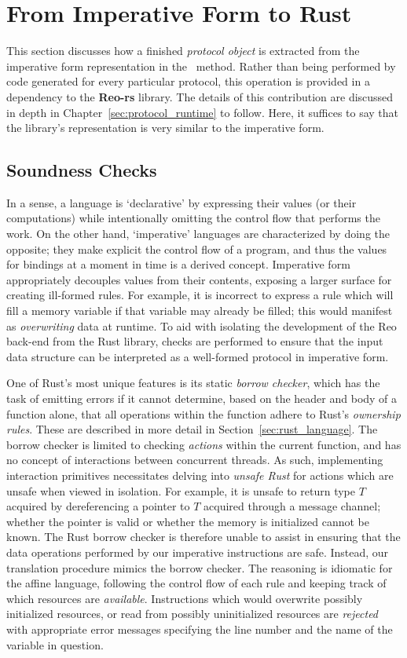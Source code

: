 \section{From Imperative Form to Rust}
This section discusses how a finished \textit{protocol object} is extracted from the imperative form representation in the~ method. 
Rather than being performed by code generated for every particular protocol, this operation is provided in a dependency to the \textbf{Reo-rs} library. The details of this contribution are discussed in depth in Chapter~\ref{sec:protocol_runtime} to follow. Here, it suffices to say that the library's representation is very similar to the imperative form.

\subsection{Soundness Checks}
In a sense, a language is `declarative' by expressing their values (or their computations) while intentionally omitting the control flow that performs the work. On the other hand, `imperative' languages are characterized by doing the opposite; they make explicit the control flow of a program, and thus the values for bindings at a moment in time is a derived concept. Imperative form appropriately decouples values from their contents, exposing a larger surface for creating ill-formed rules. For example, it is incorrect to express a rule which will fill a memory variable if that variable may already be filled; this would manifest as \textit{overwriting} data at runtime. To aid with isolating the development of the Reo back-end from the Rust library, checks are performed to ensure that the input data structure can be interpreted as a well-formed protocol in imperative form. 

One of Rust's most unique features is its static \textit{borrow checker}, which has the task of emitting errors if it cannot determine, based on the header and body of a function alone, that all operations within the function adhere to Rust's \textit{ownership rules}. These are described in more detail in Section~\ref{sec:rust_language}. The borrow checker is limited to checking \textit{actions} within the current function, and has no concept of interactions between concurrent threads. As such, implementing interaction primitives necessitates delving into \textit{unsafe Rust} for actions which are unsafe when viewed in isolation. For example, it is unsafe to return type $T$ acquired by dereferencing a pointer to $T$ acquired through a message channel; whether the pointer is valid or whether the memory is initialized cannot be known. The Rust borrow checker is therefore unable to assist in ensuring that the data operations performed by our imperative instructions are safe. Instead, our translation procedure mimics the borrow checker. The reasoning is idiomatic for the affine language, following the control flow of each rule and keeping track of which resources are \textit{available}. Instructions which would overwrite possibly initialized resources, or read from possibly uninitialized resources are \textit{rejected} with appropriate error messages specifying the line number and the name of the variable in question. 

